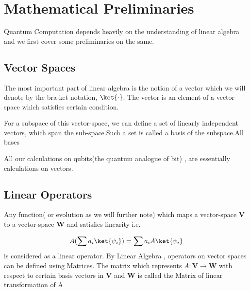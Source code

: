 \section{Mathematical Preliminaries}
Quantum Computation depends heavily on the 
understanding of linear algebra and we first cover some preliminaries
on the same.
\subsection{Vector Spaces}
The most important part of linear algebra is the notion of a vector which we will denote by the bra-ket notation, $\ket{\cdot}$.
The vector is an element of a vector space which satisfies certain condition.

For a subspace of this vector-space, we can define a set of linearly independent vectors, which span the sub-space.Such a set is called a basis of the subspace.All bases 

All our calculations on qubits(the quantum analogue of bit) , are essentially calculations on vectors. 

\subsection{Linear Operators}
Any function( or evolution as we will further note) which maps a vector-space \textbf{V} to a vector-space \textbf{W} and satisfies linearity i.e.

$$ A(\sum a_i \ket{\psi _i}) = \sum a_i A \ket{\psi _i} $$
is considered as a linear operator. By Linear Algebra , operators on vector spaces can be defined using Matrices. The matrix which represents $A: \textbf{V} \rightarrow \textbf{W}$ with respect to certain basis vectors in \textbf{V} and \textbf{W} is called the Matrix of linear transformation of A

